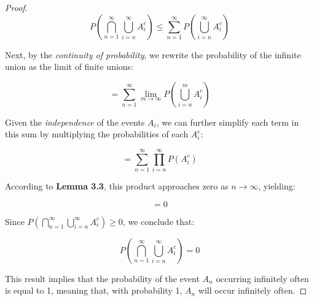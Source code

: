 \begin{proof}
\[
P \left( \bigcap_{n=1}^{\infty} \bigcup_{i=n}^{\infty} A_i^c \right) \leq \sum_{n=1}^{\infty} P \left( \bigcup_{i=n}^{\infty} A_i^c \right)
\]

Next, by the \textit{continuity of probability}, we rewrite the probability of the infinite union as the limit of finite unions:

\[
= \sum_{n=1}^{\infty} \lim_{m \to \infty} P \left( \bigcup_{i=n}^{m} A_i^c \right)
\]

Given the \textit{independence} of the events \( A_i \), we can further simplify each term in this sum by multiplying the probabilities of each \( A_i^c \):

\[
= \sum_{n=1}^{\infty} \prod_{i=n}^{\infty} P(A_i^c)
\]

According to \textbf{Lemma 3.3}, this product approaches zero as \( n \to \infty \), yielding:

\[
= 0
\]

Since \( P \left( \bigcap_{n=1}^{\infty} \bigcup_{i=n}^{\infty} A_i^c \right) \geq 0 \), we conclude that:

\[
P \left( \bigcap_{n=1}^{\infty} \bigcup_{i=n}^{\infty} A_i^c \right) = 0
\]

This result implies that the probability of the event \( A_n \) occurring infinitely often is equal to 1, meaning that, with probability 1, \( A_n \) will occur infinitely often.

\end{proof}

